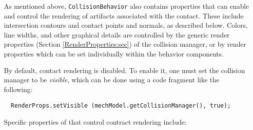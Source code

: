 As mentioned above, {\tt CollisionBehavior} also contains properties
that can enable and control the rendering of artifacts associated with
the contact. These include intersection contours and contact points
and normals, as described below. Colors, line widths, and other
graphical details are controlled by the generic render properties
(Section \ref{RenderProperties:sec}) of the collision manager, or by
render properties which can be set individually within the behavior
components.

By default, contact rendering is disabled. To enable it, one must set
the collision manager to be {\it visible}, which can be done using a code
fragment like the following:
%
\begin{verbatim}
  RenderProps.setVisible (mechModel.getCollisionManager(), true);
\end{verbatim}
%

Specific properties of
 that control
contract rendering include:

